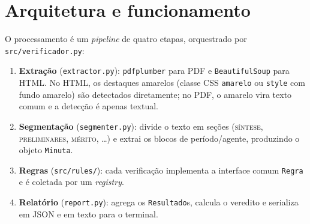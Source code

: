 \documentclass[11pt,a4paper]{article}
\begin{document}
\section{Arquitetura e funcionamento}

O processamento é um \emph{pipeline} de quatro etapas, orquestrado por
\texttt{src/verificador.py}:

\begin{enumerate}[leftmargin=1.6em]
  \item \textbf{Extração} (\texttt{extractor.py}): \texttt{pdfplumber} para PDF e
        \texttt{BeautifulSoup} para HTML. No HTML, os destaques amarelos (classe
        CSS \texttt{amarelo} ou \texttt{style} com fundo amarelo) são detectados
        diretamente; no PDF, o amarelo vira texto comum e a detecção é apenas
        textual.
  \item \textbf{Segmentação} (\texttt{segmenter.py}): divide o texto em seções
        (\textsc{síntese}, \textsc{preliminares}, \textsc{mérito}, \ldots) e
        extrai os blocos de período/agente, produzindo o objeto \texttt{Minuta}.
  \item \textbf{Regras} (\texttt{src/rules/}): cada verificação implementa a
        interface comum \texttt{Regra} e é coletada por um \emph{registry}.
  \item \textbf{Relatório} (\texttt{report.py}): agrega os \texttt{Resultado}s,
        calcula o veredito e serializa em JSON e em texto para o terminal.
\end{enumerate}
\end{document}
